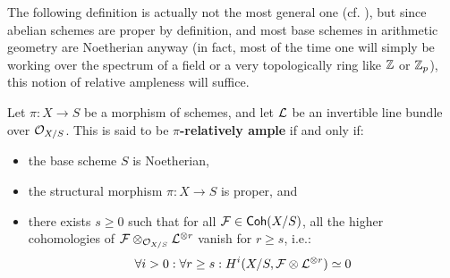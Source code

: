                     The following definition is actually not the most general one (cf. \cite[\href{https://stacks.math.columbia.edu/tag/01VG}{Tag 01VG}]{stacks}), but since abelian schemes are proper by definition, and most base schemes in arithmetic geometry are Noetherian anyway (in fact, most of the time one will simply be working over the spectrum of a field or a very topologically  ring like $\mathbb{Z}$ or $\mathbb{Z}_p$), this notion of relative ampleness will suffice.
                    \begin{definition} \label{def: relatively_ample_line_bundles}
                        Let $\pi: X \to S$ be a morphism of schemes, and let $\mathcal{L}$ be an invertible line bundle over $\mathcal{O}_{X/S}$. This is said to be \textbf{$\pi$-relatively ample} if and only if:
                            \begin{itemize}
                                \item the base scheme $S$ is Noetherian,
                                \item the structural morphism $\pi: X \to S$ is proper, and
                                \item there exists $s \geq 0$ such that for all $\mathcal{F} \in \mathsf{Coh}(X/S)$, all the higher cohomologies of $\calF \tensor_{\calO_{X/S}} \calL^{\tensor r}$ vanish for $r \geq s$, i.e.:
                                    $$\forall i > 0: \forall r \geq s: H^i(X/S, \calF \tensor \calL^{\tensor r}) \cong 0$$
                            \end{itemize}
                    \end{definition}
